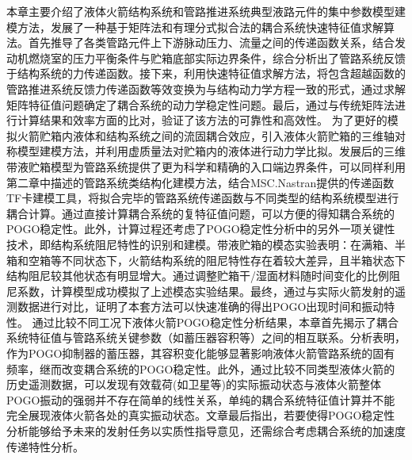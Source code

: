 \begin{enumerate}[label=\textbf{\Roman*.}, align=left, leftmargin=0pt, listparindent=\parindent, itemindent=!, labelwidth=\parindent, labelsep=0pt, itemsep=1em]
   本章主要介绍了液体火箭结构系统和管路推进系统典型液路元件的集中参数模型建模方法，发展了一种基于矩阵法和有理分式拟合法的耦合系统快速特征值求解算法。首先推导了各类管路元件上下游脉动压力、流量之间的传递函数关系，结合发动机燃烧室的压力平衡条件与贮箱底部实际边界条件，综合分析出了管路系统反馈于结构系统的力传递函数。接下来，利用快速特征值求解方法，将包含超越函数的管路推进系统反馈力传递函数等效变换为与结构动力学方程一致的形式，通过求解矩阵特征值问题确定了耦合系统的动力学稳定性问题。最后，通过与传统矩阵法进行计算结果和效率方面的比对，验证了该方法的可靠性和高效性。
   为了更好的模拟火箭贮箱内液体和结构系统之间的流固耦合效应，引入液体火箭贮箱的三维轴对称模型建模方法，并利用虚质量法对贮箱内的液体进行动力学比拟。发展后的三维带液贮箱模型为管路系统提供了更为科学和精确的入口端边界条件，可以同样利用第二章中描述的管路系统类结构化建模方法，结合MSC.Nastran提供的传递函数TF卡建模工具，将拟合完毕的管路系统传递函数与不同类型的结构系统模型进行耦合计算。通过直接计算耦合系统的复特征值问题，可以方便的得知耦合系统的POGO稳定性。此外，计算过程还考虑了POGO稳定性分析中的另外一项关键性技术，即结构系统阻尼特性的识别和建模。带液贮箱的模态实验表明：在满箱、半箱和空箱等不同状态下，火箭结构系统的阻尼特性存在着较大差异，且半箱状态下结构阻尼较其他状态有明显增大。通过调整贮箱干/湿面材料随时间变化的比例阻尼系数，计算模型成功模拟了上述模态实验结果。最终，通过与实际火箭发射的遥测数据进行对比，证明了本套方法可以快速准确的得出POGO出现时间和振动特性。
   通过比较不同工况下液体火箭POGO稳定性分析结果，本章首先揭示了耦合系统特征值与管路系统关键参数（如蓄压器容积等）之间的相互联系。分析表明，作为POGO抑制器的蓄压器，其容积变化能够显著影响液体火箭管路系统的固有频率，继而改变耦合系统的POGO稳定性。此外，通过比较不同类型液体火箭的历史遥测数据，可以发现有效载荷(如卫星等)的实际振动状态与液体火箭整体POGO振动的强弱并不存在简单的线性关系，单纯的耦合系统特征值计算并不能完全展现液体火箭各处的真实振动状态。文章最后指出，若要使得POGO稳定性分析能够给予未来的发射任务以实质性指导意见，还需综合考虑耦合系统的加速度传递特性分析。
\end{enumerate}